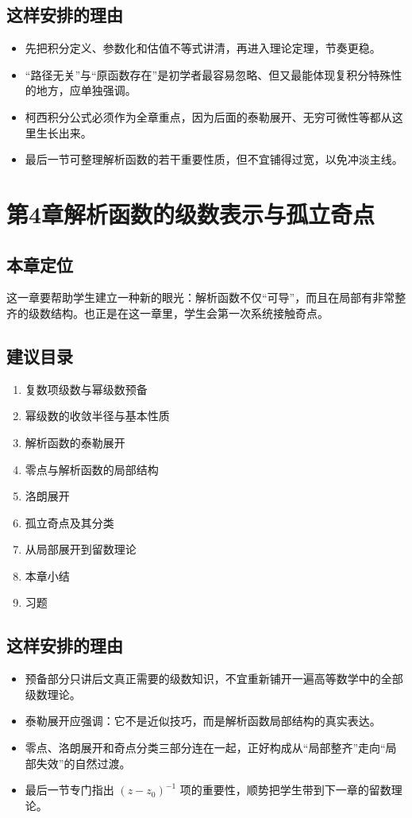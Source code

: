 \subsection*{这样安排的理由}
\begin{itemize}
    \item 先把积分定义、参数化和估值不等式讲清，再进入理论定理，节奏更稳。
    \item ``路径无关''与``原函数存在''是初学者最容易忽略、但又最能体现复积分特殊性的地方，应单独强调。
    \item 柯西积分公式必须作为全章重点，因为后面的泰勒展开、无穷可微性等都从这里生长出来。
    \item 最后一节可整理解析函数的若干重要性质，但不宜铺得过宽，以免冲淡主线。
\end{itemize}

\section*{第4章\quad 解析函数的级数表示与孤立奇点}

\subsection*{本章定位}
这一章要帮助学生建立一种新的眼光：解析函数不仅``可导''，而且在局部有非常整齐的级数结构。也正是在这一章里，学生会第一次系统接触奇点。

\subsection*{建议目录}
\begin{enumerate}
    \item 复数项级数与幂级数预备
    \item 幂级数的收敛半径与基本性质
    \item 解析函数的泰勒展开
    \item 零点与解析函数的局部结构
    \item 洛朗展开
    \item 孤立奇点及其分类
    \item 从局部展开到留数理论
    \item 本章小结
    \item 习题
\end{enumerate}

\subsection*{这样安排的理由}
\begin{itemize}
    \item 预备部分只讲后文真正需要的级数知识，不宜重新铺开一遍高等数学中的全部级数理论。
    \item 泰勒展开应强调：它不是近似技巧，而是解析函数局部结构的真实表达。
    \item 零点、洛朗展开和奇点分类三部分连在一起，正好构成从``局部整齐''走向``局部失效''的自然过渡。
    \item 最后一节专门指出 $(z-z_0)^{-1}$ 项的重要性，顺势把学生带到下一章的留数理论。
\end{itemize}

